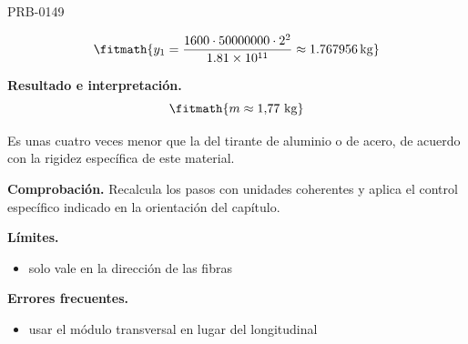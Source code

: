 \begin{studiumworked}{PRB-0149}
\begin{enumerate}
\[\fitmath{y_{1}=\frac{1600\cdot 50000000\cdot {2}^{2}}{1.81\times10^{11}}\approx 1.767956\,\mathrm{kg}}\]

\end{enumerate}

\textbf{Resultado e interpretación.}\[\fitmath{m \approx 1{,}77\ \mathrm{kg}}\]

Es unas cuatro veces menor que la del tirante de aluminio o de acero, de acuerdo con la rigidez específica de este material.

\par\textbf{Comprobación.} Recalcula los pasos con unidades coherentes y aplica el control específico indicado en la orientación del capítulo.

\textbf{Límites.}\begin{itemize}\item solo vale en la dirección de las fibras\end{itemize}

\textbf{Errores frecuentes.}\begin{itemize}\item usar el módulo transversal en lugar del longitudinal\end{itemize}

\end{studiumworked}

\Needspace{.3\textheight}

